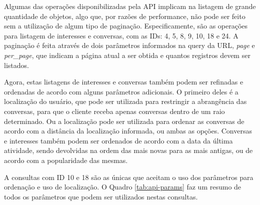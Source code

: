 \documentclass[diss]{template/setrem}
\begin{document}
Algumas das operações disponibilizadas pela API implicam na listagem de grande quantidade de objetos, algo que, por razões de performance, não pode ser feito sem a utilização de algum tipo de paginação. Especificamente, são as operações para listagem de interesses e conversas, com as IDs: 4, 5, 8, 9, 10, 18 e 24. A paginação é feita através de dois parâmetros informados na query da URL, \emph{page} e \emph{per\_page}, que indicam a página atual a ser obtida e quantos registros devem ser listados.

Agora, estas listagens de interesses e conversas também podem ser refinadas e ordenadas de acordo com alguns parâmetros adicionais. O primeiro deles é a localização do usuário, que pode ser utilizada para restringir a abrangência das conversas, para que o cliente receba apenas conversas dentro de um raio determinado. Ou a localização pode ser utilizada para ordenar as conversas de acordo com a distância da localização informada, ou ambas as opções. Conversas e interesses também podem ser ordenados de acordo com a data da última atividade, sendo devolvidas na ordem das mais novas para as mais antigas, ou de acordo com a popularidade das mesmas.

A consultas com ID 10 e 18 são as únicas que aceitam o uso dos parâmetros para ordenação e uso de localização. O Quadro \ref{tab:api-params} faz um resumo de todos os parâmetros que podem ser utilizados nestas consultas.
\end{document}
